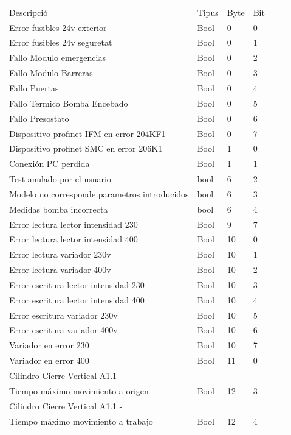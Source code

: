\documentclass{tfgitic}[2022/06/30]
\begin{document}
\begin{table}[h]
\centering
\begin{tabular}{
>{\columncolor[HTML]{EBEAEA}}llllll}
\cellcolor[HTML]{D3D3D3} Descripció & \cellcolor[HTML]{D3D3D3} Tipus & \cellcolor[HTML]{D3D3D3} Byte &  \cellcolor[HTML]{D3D3D3} Bit \\
Error fusibles 24v exterior & Bool & 0 & 0 \\
Error fusibles 24v seguretat& Bool & 0 & 1 \\
Fallo Modulo emergencias & Bool & 0 & 2 \\
Fallo Modulo Barreras& Bool & 0 & 3 \\
Fallo Puertas& Bool & 0 & 4 \\
Fallo Termico Bomba Encebado& Bool & 0 & 5 \\
Fallo Presostato & Bool & 0 & 6 \\
Dispositivo profinet IFM en error 204KF1& Bool & 0 & 7 \\
Dispositivo profinet SMC en error 206K1& Bool & 1 & 0 \\
Conexión PC perdida& Bool & 1 & 1 \\
Test anulado por el usuario& bool & 6 & 2 \\
Modelo no corresponde parametros introducidos& bool & 6 & 3 \\
Medidas bomba incorrecta& bool & 6 & 4 \\
Error lectura lector intensidad 230& Bool & 9 & 7 \\
Error lectura lector intensidad 400& Bool & 10 & 0 \\
Error lectura variador 230v& Bool & 10 & 1 \\
Error lectura variador 400v& Bool & 10 & 2 \\
Error escritura lector intensidad 230& Bool & 10 & 3 \\
Error escritura lector intensidad 400& Bool & 10 & 4 \\
Error escritura variador 230v& Bool & 10 & 5 \\
Error escritura variador 400v& Bool & 10 & 6 \\
Variador en error 230& Bool & 10 & 7 \\
Variador en error 400& Bool & 11 & 0 \\
Cilindro Cierre Vertical A1.1 - \\Tiempo máximo movimiento a origen& Bool & 12 & 3 \\
Cilindro Cierre Vertical A1.1 -\\Tiempo máximo movimiento a trabajo& Bool & 12 & 4 \\

\end{tabular}
\end{table}
\end{document}

